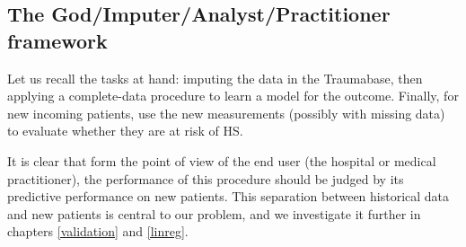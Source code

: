 		\subsection{The God/Imputer/Analyst/Practitioner framework}
		\label{framework}
Let us recall the tasks at hand: imputing the data in the Traumabase, then applying a complete-data procedure to learn a model for the outcome. Finally, for new incoming patients, use the new measurements (possibly with missing data) to evaluate whether they are at risk of HS. 

It is clear that form the point of view of the end user (the hospital or medical practitioner), the performance of this procedure should be judged by its predictive performance on new patients. This separation between historical data and new patients is central to our problem, and we investigate it further in chapters \ref{validation} and \ref{linreg}.

